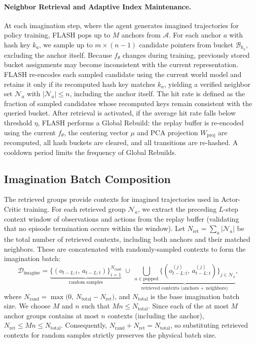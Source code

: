 \documentclass{article} %
\begin{document}
\paragraph{Neighbor Retrieval and Adaptive Index Maintenance.} At each imagination step, where the agent generates imagined trajectories for policy training, FLASH pops up to $M$ anchors from $\mathcal{A}$. For each anchor $a$ with hash key $k_a$, we sample up to $m \times (n{-}1)$ candidate pointers from bucket $\mathcal{B}_{k_a}$, excluding the anchor itself. Because $f_\theta$ changes during training, previously stored bucket assignments may become inconsistent with the current representation. FLASH re-encodes each sampled candidate using the current world model and retains it only if its recomputed hash key matches $k_a$, yielding a verified neighbor set $\mathcal{N}_a$ with $|\mathcal{N}_a|\leq n$, including the anchor itself. The hit rate is defined as the fraction of sampled candidates whose recomputed keys remain consistent with the queried bucket. After retrieval is activated, if the average hit rate falls below threshold $\eta$, FLASH performs a Global Rebuild: the replay buffer is re-encoded using the current $f_\theta$, the centering vector $\mu$ and PCA projection $W_{\text{proj}}$ are recomputed, all hash buckets are cleared, and all transitions are re-hashed. A cooldown period limits the frequency of Global Rebuilds.

\subsection{Imagination Batch Composition}
\label{subsec:flash_learning}
The retrieved groups provide contexts for imagined trajectories used in Actor-Critic training.
For each retrieved group $\mathcal{N}_a$, we extract the preceding $L$-step context window of observations and actions from the replay buffer (validating that no episode termination occurs within the window). Let $N_{\text{ret}} = \sum_{a} |\mathcal{N}_a|$ be the total number of retrieved contexts, including both anchors and their matched neighbors. These are concatenated with randomly-sampled contexts to form the imagination batch:
\begin{equation}
\mathcal{D}_{\text{imagine}} = \underbrace{\{(o_{t-L:t},\, a_{t-L:t})\}_{i=1}^{N_\text{rand}}}_{\text{random samples}} \;\cup\; \underbrace{\bigcup_{a \in \text{popped}} \{(o^{(j)}_{t-L:t},\, a^{(j)}_{t-L:t})\}_{j \in \mathcal{N}_a}}_{\text{retrieved contexts (anchors + neighbors)}},
\label{eq:batch_compose}
\end{equation}
where $N_{\text{rand}} = \max\big(0,\, N_{\text{total}} - N_{\text{ret}}\big)$, and $N_{\text{total}}$ is the base imagination batch size. We choose $M$ and $n$ such that $Mn \leq N_{\text{total}}$. Since each of the at most $M$ anchor groups contains at most $n$ contexts (including the anchor), $N_{\text{ret}} \leq Mn \leq N_{\text{total}}$. Consequently, $N_{\text{rand}} + N_{\text{ret}} = N_{\text{total}}$, so substituting retrieved contexts for random samples strictly preserves the physical batch size.
\end{document}

